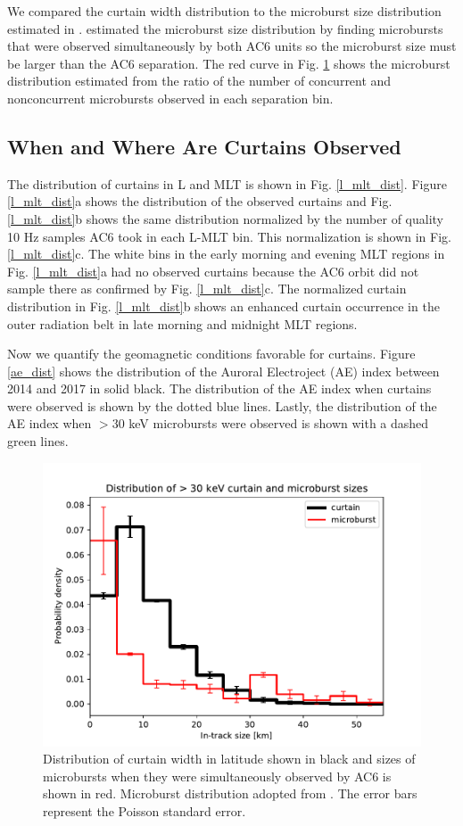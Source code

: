 \documentclass[draft]{agujournal2019}
\begin{document}
We compared the curtain width distribution to the microburst size distribution estimated in .  estimated the microburst size distribution by finding microbursts that were observed simultaneously by both AC6 units so the microburst size must be larger than the AC6 separation. The red curve in Fig. \ref{width_dist} shows the microburst distribution estimated from the ratio of the number of concurrent and nonconcurrent microbursts observed in each separation bin. 

\subsection{When and Where Are Curtains Observed}
The distribution of curtains in L and MLT is shown in Fig. \ref{l_mlt_dist}. Figure \ref{l_mlt_dist}a shows the distribution of the observed curtains and Fig. \ref{l_mlt_dist}b shows the same distribution normalized by the number of quality 10 Hz samples AC6 took in each L-MLT bin. This normalization is shown in Fig. \ref{l_mlt_dist}c. The white bins in the early morning and evening MLT regions in Fig. \ref{l_mlt_dist}a had no observed curtains because the AC6 orbit did not sample there as confirmed by Fig. \ref{l_mlt_dist}c. The normalized curtain distribution in Fig. \ref{l_mlt_dist}b shows an enhanced curtain occurrence in the outer radiation belt in late morning and midnight MLT regions.

Now we quantify the geomagnetic conditions favorable for curtains. Figure \ref{ae_dist} shows the distribution of the Auroral Electroject (AE) index between 2014 and 2017 in solid black. The distribution of the AE index when curtains were observed is shown by the dotted blue lines. Lastly, the distribution of the AE index when $> 30$ keV microbursts were observed is shown with a dashed green lines. 

\begin{figure}
\includegraphics[width=\textwidth]{ac6_curtain_microburst_width_dist.pdf}
\caption{Distribution of curtain width in latitude shown in black and sizes of microbursts when they were simultaneously observed by AC6 is shown in red. Microburst distribution adopted from . The error bars represent the Poisson standard error.}
\label{width_dist}
\end{figure}
\end{document}
